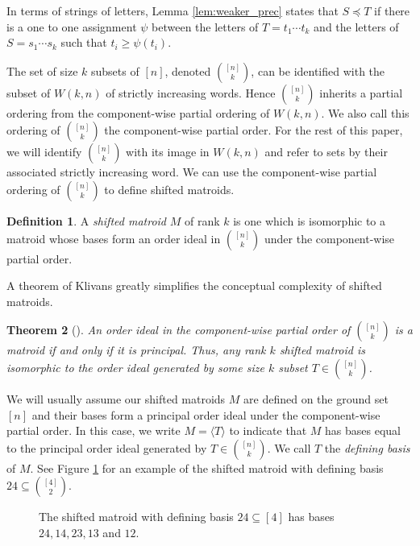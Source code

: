 \documentclass{amsart}
\theoremstyle{definition}
\newtheorem{defn}{Definition}[section]
\theoremstyle{plain}
\newtheorem{thrm}[defn]{Theorem}
\begin{document}
In terms of strings of letters, Lemma \ref{lem:weaker_prec} states that $S\preceq T$ if there is a one to one assignment $\psi$ between the letters of $T=t_1\cdots t_k$ and the letters of $S=s_1\cdots s_k$ such that $t_i \geq \psi(t_i)$.

The set of size $k$ subsets of $[n]$, denoted $\binom{[n]}{k}$, can be identified with the subset of $W(k,n)$ of strictly increasing words. Hence $\binom{[n]}{k}$ inherits a partial ordering from the component-wise partial ordering of $W(k,n)$. We also call this ordering of $\binom{[n]}{k}$ the component-wise partial order. For the rest of this paper, we will identify $\binom{[n]}{k}$ with its image in $W(k,n)$ and refer to sets by their associated strictly increasing word. We can use the component-wise partial ordering of $\binom{[n]}{k}$ to define shifted matroids.

\begin{defn}\label{def:shifted}
A \emph{shifted matroid} $M$ of rank $k$ is one which is isomorphic to a matroid whose bases form an order ideal in $\binom{[n]}{k}$ under the component-wise partial order. 
\end{defn}

A theorem of Klivans \cite{K-thesis} greatly simplifies the conceptual complexity of shifted matroids.

\begin{thrm}[{\cite[Theorem $5.4.1$]{K-thesis}}]
An order ideal in the component-wise partial order of $\binom{[n]}{k}$ is a matroid if and only if it is principal. Thus, any rank $k$ shifted matroid is isomorphic to the order ideal generated by some size $k$ subset $T\in \binom{[n]}{k}$.
\end{thrm}


We will usually assume our shifted matroids $M$ are defined on the ground set $[n]$ and their bases form a principal order ideal under the component-wise partial order. In this case, we write $M=\langle T \rangle$ to indicate that $M$ has bases equal to the principal order ideal generated by $T\in \binom{[n]}{k}$. We call $T$ the \emph{defining basis} of $M$. See Figure \ref{fig:shifted} for an example of the shifted matroid with defining basis $24\subseteq \binom{[4]}{2}$.



\begin{figure}[ht]
\caption{The shifted matroid with defining basis $24\subseteq [4]$ has bases $24,14,23,13$ and $12$.}
\label{fig:shifted}
\end{figure}
\end{document}
